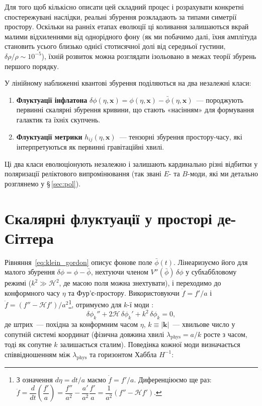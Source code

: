 Для того щоб кількісно описати цей складний процес і розрахувати конкретні
спостережувані наслідки, реальні збурення розкладають за типами симетрії
простору. Оскільки на ранніх етапах еволюції ці коливання залишаються вкрай
малими відхиленнями від однорідного фону (як ми побачимо далі, їхня амплітуда
становить усього близько однієї стотисячної долі від середньої густини,
$\delta\rho/\rho \sim 10^{-5}$), їхній розвиток можна розглядати ізольовано
в межах теорії збурень першого порядку.

У лінійному наближенні квантові збурення поділяються на два незалежні класи:
\begin{enumerate}
  \item \textbf{Флуктуації інфлатона} $\delta\phi(\eta, \mathbf{x}) = \phi(\eta, \mathbf{x}) - \bar{\phi}(\eta, \mathbf{x})$~---
        породжують первинні скалярні збурення кривини, що стають
        «насінням» для формування галактик та їхніх скупчень.
  \item \textbf{Флуктуації метрики} $h_{ij}(\eta, \mathbf{x})$~---
        тензорні збурення простору-часу, які інтерпретуються як первинні
        гравітаційні хвилі.
\end{enumerate}
Ці два класи еволюціонують незалежно і залишають кардинально різні відбитки
у поляризації реліктового випромінювання (так звані $E$- та $B$-моди, які ми
детально розглянемо у §\,\ref{sec:pol}).

\section{Скалярні флуктуації у просторі де-Сіттера}

Рівняння~\eqref{eq:klein_gordon} описує фонове поле $\bar{\phi}(t)$.
Лінеаризуємо його для малого збурення $\delta\phi = \phi - \bar{\phi}$,
нехтуючи членом $V''(\bar{\phi})\,\delta\phi$ у субхаббловому режимі
($k^2 \gg \mathcal{H}^2$, де масою поля можна знехтувати), і переходимо
до конформного часу $\eta$ та Фур'є-простору. Використовуючи
$\dot{f} = f'/a$ і $\ddot{f} = (f'' - \mathcal{H}f')/a^2$\footnote{%
З означення $d\eta = dt/a$ маємо $\dot{f} = f'/a$. Диференціюємо ще раз:
$\ddot{f} = \dfrac{d}{dt}\!\left(\dfrac{f'}{a}\right)
= \dfrac{f''}{a^2} - \dfrac{a'}{a^2}\dfrac{f'}{a}
= \dfrac{1}{a^2}(f'' - \mathcal{H}f')$.},
отримуємо для $k$-ї моди \cite{mukhanov_2005}:
\begin{equation}\label{eq:fourier_field}
  \delta\phi_k'' + 2\mathcal{H}\,\delta\phi_k' + k^2\,\delta\phi_k = 0,
\end{equation}
де штрих~--- похідна за конформним часом $\eta$, $k \equiv |\mathbf{k}|$~---
хвильове число у сопутній системі координат (фізична довжина хвилі
$\lambda_\mathrm{phys} = a/k$ росте з часом, тоді як сопутне $k$ залишається сталим).
Поведінка кожної моди визначається співвідношенням між $\lambda_\mathrm{phys}$
та горизонтом Хаббла $H^{-1}$:

